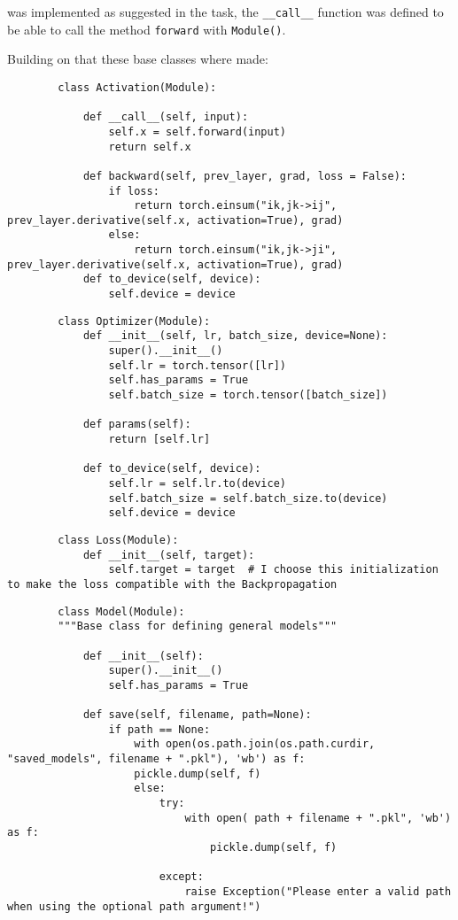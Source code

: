\documentclass[11pt,english]{article}
\begin{document}
	was implemented as suggested in the task, the \lstinline|__call__| function was defined to be able to call the method \lstinline|forward| with \lstinline|Module()|.
	
	Building on that these base classes where made: 
	
	\begin{lstlisting}
		class Activation(Module):
		
			def __call__(self, input):
				self.x = self.forward(input)
				return self.x
		
			def backward(self, prev_layer, grad, loss = False):
				if loss:
					return torch.einsum("ik,jk->ij", prev_layer.derivative(self.x, activation=True), grad) 
				else:
					return torch.einsum("ik,jk->ji", prev_layer.derivative(self.x, activation=True), grad) 
			def to_device(self, device):
				self.device = device
	\end{lstlisting}
	
	\begin{lstlisting}
		class Optimizer(Module):
			def __init__(self, lr, batch_size, device=None):
				super().__init__()
				self.lr = torch.tensor([lr])
				self.has_params = True
				self.batch_size = torch.tensor([batch_size])
		
			def params(self):
				return [self.lr]
			
			def to_device(self, device):
				self.lr = self.lr.to(device)
				self.batch_size = self.batch_size.to(device)
				self.device = device
	\end{lstlisting}	

	\begin{lstlisting}
		class Loss(Module):
			def __init__(self, target):
				self.target = target  # I choose this initialization to make the loss compatible with the Backpropagation 
	\end{lstlisting} 
	
	\begin{lstlisting}
		class Model(Module):
		"""Base class for defining general models"""
		
			def __init__(self):
				super().__init__()
				self.has_params = True
			
			def save(self, filename, path=None):
				if path == None:
					with open(os.path.join(os.path.curdir, "saved_models", filename + ".pkl"), 'wb') as f:
					pickle.dump(self, f)
					else:
						try:
							with open( path + filename + ".pkl", 'wb') as f:
								pickle.dump(self, f)
			
						except:
							raise Exception("Please enter a valid path when using the optional path argument!")
		
	\end{lstlisting}
	
\end{document}
